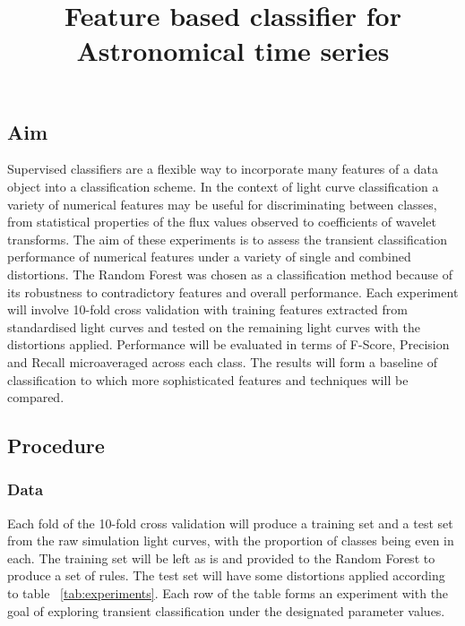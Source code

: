 \documentclass[10pt]{report}
\title{Feature based classifier for Astronomical time series}
\date{}
\begin{document}
	
	\chapter{}
	\section{Aim}
		Supervised classifiers are a flexible way to incorporate many features of a data object into a classification scheme. In the context of light curve classification a variety of numerical features may be useful for discriminating between classes, from statistical properties of the flux values observed to coefficients of wavelet transforms. The aim of these experiments is to assess the transient classification performance of numerical features under a variety of single and combined distortions. The Random Forest was chosen as a classification method because of its robustness to contradictory features and overall performance. Each experiment will involve 10-fold cross validation with training features extracted from standardised light curves and tested on the remaining light curves with the distortions applied. Performance will be evaluated in terms of F-Score, Precision and Recall microaveraged across each class. The results will form a baseline of classification to which more sophisticated features and techniques will be compared.

	\section{Procedure}

	
	\subsection{Data}
	Each fold of the 10-fold cross validation will produce a training set and a test set from the raw simulation light curves, with the proportion of classes being even in each. The training set will be left as is and provided to the Random Forest to produce a set of rules. The test set will have some distortions applied according to table ~\ref{tab:experiments}. Each row of the table forms an experiment with the goal of exploring transient classification under the designated parameter values. \\
\end{document}
